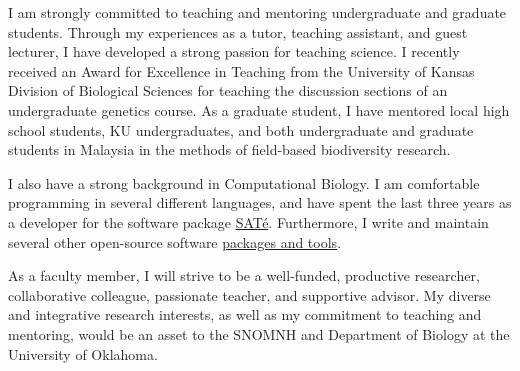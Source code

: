 \documentclass[letterpaper, 10pt]{letter}
\begin{document}
\begin{letter}

I am strongly committed to teaching and mentoring undergraduate and graduate
students.
Through my experiences as a tutor, teaching assistant, and guest lecturer, I
have developed a strong passion for teaching science.
I recently received an Award for Excellence in Teaching from the University of
Kansas Division of Biological Sciences for teaching the discussion sections of
an undergraduate genetics course.
As a graduate student, I have mentored local high school students, KU
undergraduates, and both undergraduate and graduate students in Malaysia in the
methods of field-based biodiversity research.

I also have a strong background in Computational Biology.
I am comfortable programming in several different languages, and have spent the
last three years as a developer for the software package
\href{http://phylo.bio.ku.edu/software/sate/sate.html}{{SAT}\'{e}}.
Furthermore, I write and maintain several other open-source software
\href{https://github.com/joaks1?tab=repositories}{packages and tools}.


As a faculty member, I will strive to be a well-funded, productive researcher,
collaborative colleague, passionate teacher, and supportive advisor.
My diverse and integrative research interests, as well as my commitment to
teaching and mentoring, would be an asset to the SNOMNH and Department of
Biology at the University of Oklahoma.


\end{letter}
\end{document}
